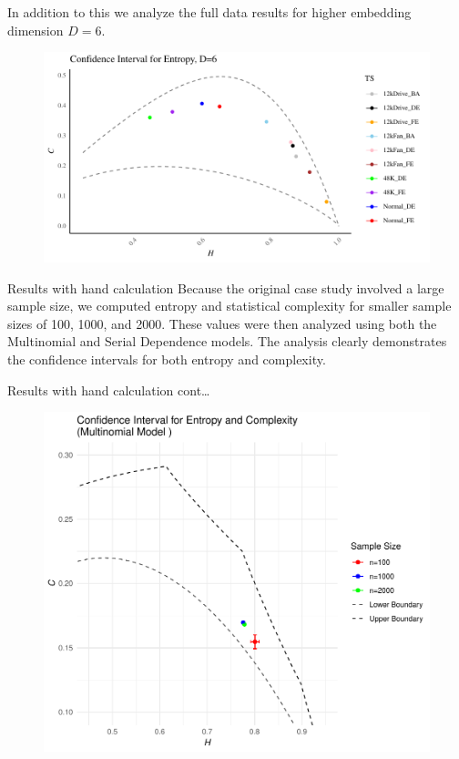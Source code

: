 \documentclass{beamer}
\begin{document}
\begin{frame}
	In addition to this we analyze the full data results for higher embedding dimension $D=6$.
		\begin{figure}[hbt]
		\centering
		\includegraphics[width=0.8 \textwidth]{Confidence Interval}
		\label{fig:EntopyComplexity Plane D=6}
	\end{figure}
\end{frame}

\begin{frame}{Results with hand calculation}
Because the original case study involved a large sample size, we computed entropy and statistical complexity for smaller sample sizes of 100, 1000, and 2000. These values were then analyzed using both the Multinomial and Serial Dependence models. The analysis clearly demonstrates the confidence intervals for both entropy and complexity.	
\end{frame}

\begin{frame}{Results with hand calculation cont\dots}
	\begin{figure}[hbt]
		\centering
		\includegraphics[width=0.7 \textwidth]{CI for Multinomial model}
	\end{figure}
\end{frame}
\end{document}
